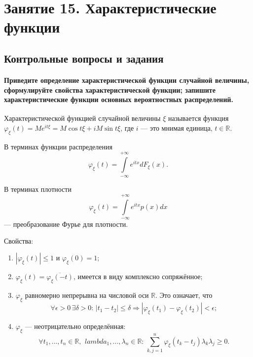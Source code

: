 \chapter*{Занятие 15. Характеристические функции}

\section*{Контрольные вопросы и задания}

\subsubsection*{Приведите определение характеристической функции случайной величины,
                сформулируйте свойства характеристической функции;
                запишите характеристические функции основных вероятностных распределений.}

Характеристической функцией случайной величины $ \xi $ называется функция
$ \varphi_{ \xi } \left( t \right) = Me^{it \xi } = M \cos t \xi + iM \sin t \xi $, где $i$ ---
это мнимая единица, $t \in \mathbb{R}$.

В терминах функции распределения
$$ \varphi_{ \xi } \left( t \right) =
  \int \limits_{- \infty }^{+ \infty } e^{itx} dF_{ \xi } \left( x \right).$$

В терминах плотности
$$ \varphi_{ \xi } \left( t \right) =
  \int \limits_{- \infty }^{+ \infty } e^{itx} p \left( x \right) dx$$
--- преобразование Фурье для плотности.

Свойства:
\begin{enumerate}
\item
  $ \left| \varphi_{ \xi } \left( t \right) \right| \leq 1$ и $ \varphi_{ \xi } \left( 0 \right) =
    1$;
\item $ \varphi_{ \xi } \left( t \right) = \overline{ \varphi_{ \xi } \left( -t \right)}$,
  имеется в виду комплексно сопряжённое;
\item $ \varphi_{ \xi }$ равномерно непрерывна на числовой оси $ \mathbb{R}$.
Это означает,
что
$$ \forall \epsilon > 0 \,
  \exists \delta > 0: \,
  \left| t_1 - t_2 \right| \leq \delta \Rightarrow
  \left| \varphi_{ \xi } \left( t_1 \right) - \varphi_{ \xi } \left( t_2 \right) \right| <
  \epsilon;$$
\item $ \varphi_{ \xi }$ --- неотрицательно определённая:
$$ \forall t_1, \dotsc, t_n \in \mathbb{R}, \,
\ lambda_1, \dotsc, \lambda_n \in \mathbb{R}: \,
  \sum \limits_{k,j=1}^n \varphi_{ \xi } \left( t_k - t_j \right) \lambda_k \lambda_j \geq 0.$$
\end{enumerate}

